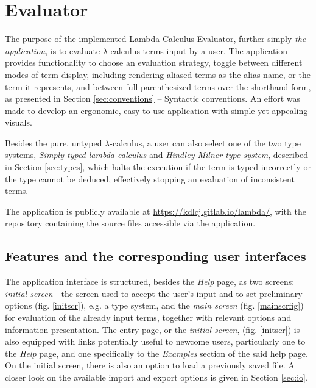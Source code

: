 \documentclass[table, a4paper, 10pt]{book}
\begin{document}
\newpage
\chapter{Evaluator}
The purpose of the implemented Lambda Calculus Evaluator,
further simply \textit{the application}, is to evaluate $\lambda$-calculus
terms input by a user.
The application provides functionality to
choose an evaluation strategy, toggle between different modes
of term-display, including rendering aliased terms as the alias name,
or the term it represents, and between full-parenthesized terms over
the shorthand form, as presented in Section \ref{sec:conventions} -- Syntactic conventions.
An effort was made to develop an ergonomic, easy-to-use application with 
simple yet appealing visuals.

Besides the pure, untyped $\lambda$-calculus, a user can also select one of the two
type systems, \textit{Simply typed lambda calculus} and \textit{Hindley-Milner type system},
described in Section \ref{sec:types}, which halts the execution if the term is typed incorrectly or the type cannot
be deduced, effectively stopping an evaluation of inconsistent terms.

The application is publicly available at \url{https://kdlcj.gitlab.io/lambda/},
with the repository containing the source files accessible via the application.

\section{Features and the corresponding user interfaces}
The application interface is structured, besides the \textit{Help} page,
as two screens: \textit{initial screen}---the screen
used to accept the user's input and to set preliminary options (fig. \ref{initscr}), e.g. a type system, and
the \textit{main screen} (fig. \ref{mainscrfig}) for evaluation of the already input terms,
together with relevant options and information presentation.
The entry page, or the \textit{initial screen}, (fig. \ref{initscr}) is
also equipped with links potentially useful
to newcome users, particularly one to the \textit{Help} page, and one specifically
to the \textit{Examples} section of the said help page. On the initial screen, there is
also an option to load a previously saved file. A closer look on
the available import and export options is given in Section \ref{sec:io}.
\end{document}

